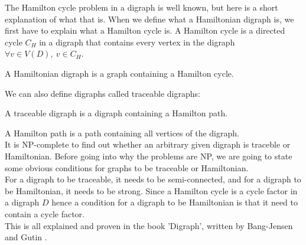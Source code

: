 The Hamilton cycle problem in a digraph is well known, but here is a short explanation of what that is.
When we define what a Hamiltonian digraph is, we first have to explain what a Hamilton cycle is. 
A Hamilton cycle is a directed cycle $C_H$ in a digraph that contains every vertex in the digraph $\forall v\in V(D),\ v\in C_H$.\\
\begin{definition}
    A Hamiltonian digraph is a graph containing a Hamilton cycle. 
\end{definition} 
We can also define digraphs called traceable digraphs:
\begin{definition}
    A traceable digraph is a digraph containing a Hamilton path.
\end{definition}
A Hamilton path is a path containing all vertices of the digraph.\\
It is NP-complete to find out whether an arbitrary given digraph is traceble or Hamiltonian.
Before going into why the problems are NP, we are going to state some obvious conditions for graphs to be traceable or Hamiltonian. \\
For a digraph to be traceable, it needs to be semi-connected, and for a digraph to be Hamiltonian, it needs to be strong. Since a Hamilton cycle is a cycle factor in a digraph $D$ hence a condition for a digraph to be Hamiltonian is that it need to contain a cycle factor.\\
This is all explained and proven in the book 'Digraph', written by Bang-Jensen and Gutin \cite{banggutin}. 

